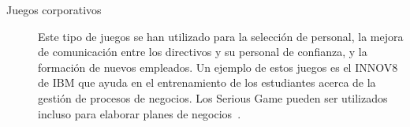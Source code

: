\begin{description}
\item[Juegos corporativos] Este tipo de juegos se han utilizado para la
	selección de personal, la mejora de comunicación entre los directivos y
	su personal de confianza, y la formación de nuevos empleados. Un ejemplo
	de estos juegos es el INNOV8 de IBM que ayuda en el entrenamiento de los
	estudiantes acerca de la gestión de procesos de negocios. Los Serious
	Game pueden ser utilizados incluso para elaborar planes de
	negocios~\cite{education:games}. 

\end{description}

